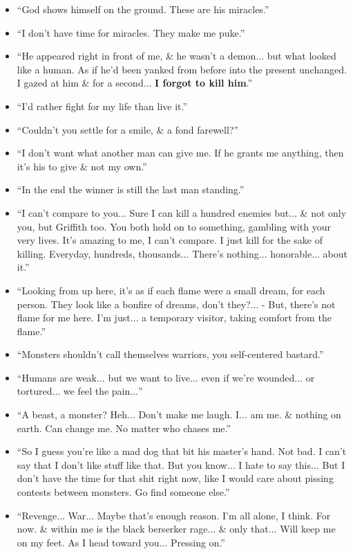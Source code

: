 \documentclass{article}
\begin{document}
\begin{enumerate}
\begin{itemize}
    	\item ``God shows himself on the ground. These are his miracles.''
    	\item ``I don't have time for miracles. They make me puke.''
    	\item ``He appeared right in front of me, \& he wasn't a demon$\ldots$ but what looked like a human. As if he'd been yanked from before into the present unchanged. I gazed at him \& for a second$\ldots$ {\bf I forgot to kill him}.''
    	\item ``I'd rather fight for my life than live it.''
    	\item ``Couldn't you settle for a smile, \& a fond farewell?''
    	\item ``I don't want what another man can give me. If he grants me anything, then it's his to give \& not my own.''
    	\item ``In the end the winner is still the last man standing.''
    	\item ``I can't compare to you$\ldots$ Sure I can kill a hundred enemies but$\ldots$ \& not only you, but Griffith too. You both hold on to something, gambling with your very lives. It's amazing to me, I can't compare. I just kill for the sake of killing. Everyday, hundreds, thousands$\ldots$ There's nothing$\ldots$ honorable$\ldots$ about it.''
    	\item ``Looking from up here, it's as if each flame were a small dream, for each person. They look like a bonfire of dreams, don't they?$\ldots$ - But, there's not flame for me here. I'm just$\ldots$ a temporary visitor, taking comfort from the flame.''
    	\item ``Monsters shouldn't call themselves warriors, you self-centered bastard.''
    	\item ``Humans are weak$\ldots$ but we want to live$\ldots$ even if we're wounded$\ldots$ or tortured$\ldots$ we feel the pain$\ldots$''
    	\item ``A beast, a monster? Heh$\ldots$ Don't make me laugh. I$\ldots$ am me. \& nothing on earth. Can change me. No matter who chases me.''
    	\item ``So I guess you're like a mad dog that bit his master's hand. Not bad. I can't say that I don't like stuff like that. But you know$\ldots$ I hate to say this$\ldots$ But I don't have the time for that shit right now, like I would care about pissing contests between monsters. Go find someone else.''
    	\item ``Revenge$\ldots$ War$\ldots$ Maybe that's enough reason. I'm all alone, I think. For now. \& within me is the black berserker rage$\ldots$ \& only that$\ldots$ Will keep me on my feet. As I head toward you$\ldots$ Pressing on.''

\end{itemize}
\end{enumerate}
\end{document}
